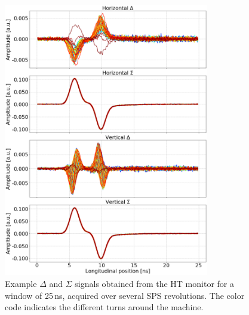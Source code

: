 \begin{figure}[!h]
   \centering         
   \includegraphics[width=0.8\textwidth]{images/Ch4/HT_1D__20180530_114730exampleAcq_4thesis_turnsStart0_Stop6000_step100.png}
       \caption{Example $\Delta$ and $\Sigma$ signals obtained from the HT monitor for a window of 25\,ns, acquired over several SPS revolutions. The color code indicates the different turns around the machine.}
       \label{fig:HT_example_acq_multTurns}
\end{figure}


